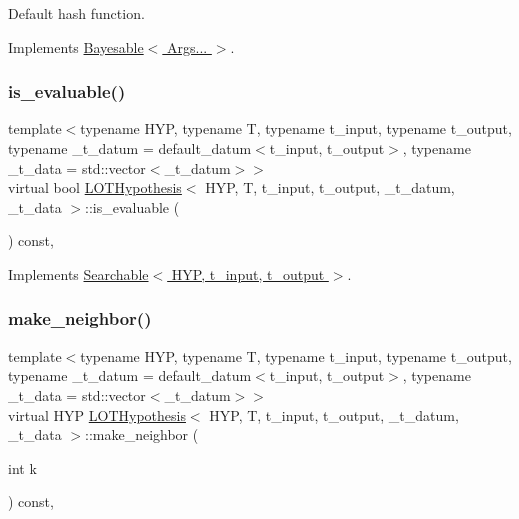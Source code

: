 Default hash function. 



Implements \hyperlink{class_bayesable_ab77a023d33951448e6edb2e1bc79c5ae}{Bayesable$<$ Args... $>$}.

\mbox{\label{class_l_o_t_hypothesis_ad43c57ed606c0f5af6cce0752725f583}} 
\subsubsection{\texorpdfstring{is\+\_\+evaluable()}{is\_evaluable()}}
{\footnotesize\ttfamily template$<$typename H\+YP, typename T, typename t\+\_\+input, typename t\+\_\+output, typename \+\_\+t\+\_\+datum = default\+\_\+datum$<$t\+\_\+input, t\+\_\+output$>$, typename \+\_\+t\+\_\+data = std\+::vector$<$\+\_\+t\+\_\+datum$>$$>$ \\
virtual bool \hyperlink{class_l_o_t_hypothesis}{L\+O\+T\+Hypothesis}$<$ H\+YP, T, t\+\_\+input, t\+\_\+output, \+\_\+t\+\_\+datum, \+\_\+t\+\_\+data $>$\+::is\+\_\+evaluable (\begin{DoxyParamCaption}{ }\end{DoxyParamCaption}) const\hspace{0.3cm}{\ttfamily [inline]}, {\ttfamily [virtual]}}



Implements \hyperlink{class_searchable_aae16f1cb01f140f4033f6f67dc9753b6}{Searchable$<$ H\+Y\+P, t\+\_\+input, t\+\_\+output $>$}.

\mbox{\label{class_l_o_t_hypothesis_a3460b6ff86b9b964f65c2298bf52b2af}} 
\subsubsection{\texorpdfstring{make\+\_\+neighbor()}{make\_neighbor()}}
{\footnotesize\ttfamily template$<$typename H\+YP, typename T, typename t\+\_\+input, typename t\+\_\+output, typename \+\_\+t\+\_\+datum = default\+\_\+datum$<$t\+\_\+input, t\+\_\+output$>$, typename \+\_\+t\+\_\+data = std\+::vector$<$\+\_\+t\+\_\+datum$>$$>$ \\
virtual H\+YP \hyperlink{class_l_o_t_hypothesis}{L\+O\+T\+Hypothesis}$<$ H\+YP, T, t\+\_\+input, t\+\_\+output, \+\_\+t\+\_\+datum, \+\_\+t\+\_\+data $>$\+::make\+\_\+neighbor (\begin{DoxyParamCaption}\item[{int}]{k }\end{DoxyParamCaption}) const\hspace{0.3cm}{\ttfamily [inline]}, {\ttfamily [virtual]}}



